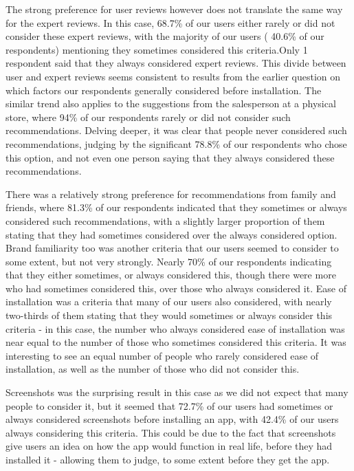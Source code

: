 \documentclass{sigchi}
\begin{document}
The strong preference for user reviews however does not translate the same way for the expert reviews. In this case, 68.7\% of our users either rarely or did not consider these expert reviews, with the majority of our users ( 40.6\% of our respondents) mentioning they sometimes considered this criteria.Only 1 respondent said that they always considered expert reviews. This divide between user and expert reviews seems consistent to results from the earlier question on which factors our respondents generally considered before installation. The similar trend also applies to the suggestions from the salesperson at a physical store, where 94\% of our respondents rarely or did not consider such recommendations. Delving deeper, it was clear that people never considered such recommendations, judging by the significant 78.8\% of our respondents who chose this option, and not even one person saying that they always considered these recommendations.

There was a relatively strong preference for recommendations from family and friends, where 81.3\% of our respondents indicated that they sometimes or always considered such recommendations, with a slightly larger proportion of them stating that they had sometimes considered over the always considered option. Brand familiarity too was another criteria that our users seemed to consider to some extent, but not very strongly. Nearly 70\% of our respondents indicating that they either sometimes, or always considered this, though there were more who had sometimes considered this, over those who always considered it. Ease of installation was a criteria that many of our users also considered, with nearly two-thirds of them stating that they would sometimes or always consider this criteria - in this case, the number who always considered ease of installation was near equal to the number of those who sometimes considered this criteria. It was interesting to see an equal number of people who rarely considered ease of installation, as well as the number of those who did not consider this.

Screenshots was the surprising result in this case as we did not expect that many people to consider it, but it seemed that 72.7\% of our users had sometimes or always considered screenshots before installing an app, with 42.4\% of our users always considering this criteria. This could be due to the fact that screenshots give users an idea on how the app would function in real life, before they had installed it - allowing them to judge, to some extent before they get the app. 
\end{document}
